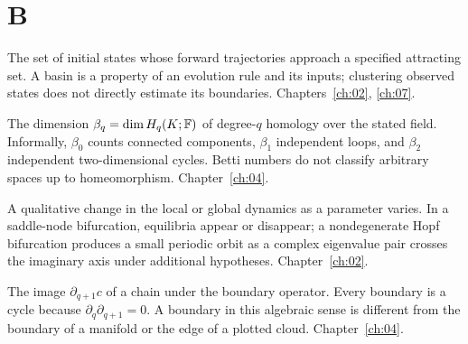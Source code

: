 \section*{B}
\begin{description}[style=nextline]
\item[Basin of attraction.] The set of initial states whose forward trajectories approach a specified attracting set. A basin is a property of an evolution rule and its inputs; clustering observed states does not directly estimate its boundaries. Chapters~\ref{ch:02}, \ref{ch:07}.
\item[Betti number.] The dimension $\beta_q=\dim H_q(K;\mathbb{F})$ of degree-$q$ homology over the stated field. Informally, $\beta_0$ counts connected components, $\beta_1$ independent loops, and $\beta_2$ independent two-dimensional cycles. Betti numbers do not classify arbitrary spaces up to homeomorphism. Chapter~\ref{ch:04}.
\item[Bifurcation.] A qualitative change in the local or global dynamics as a parameter varies. In a saddle-node bifurcation, equilibria appear or disappear; a nondegenerate Hopf bifurcation produces a small periodic orbit as a complex eigenvalue pair crosses the imaginary axis under additional hypotheses. Chapter~\ref{ch:02}.
\item[Boundary.] The image $\partial_{q+1}c$ of a chain under the boundary operator. Every boundary is a cycle because $\partial_q\partial_{q+1}=0$. A boundary in this algebraic sense is different from the boundary of a manifold or the edge of a plotted cloud. Chapter~\ref{ch:04}.
\end{description}

